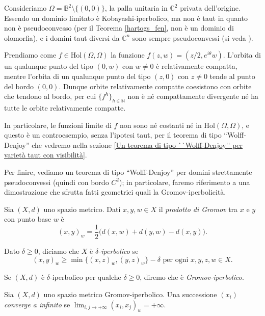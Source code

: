 \begin{ex} \label{servetaut}
    Consideriamo $\Omega=\mathbb{B}^2\setminus\{(0,0)\}$, la palla unitaria in $\mathbb{C}^2$ privata dell'origine. Essendo un dominio limitato è Kobayashi-iperbolico, ma non è taut in quanto non è pseudoconvesso (per il Teorema \ref{hartogs_fen}, non è un dominio di olomorfia), e i domini taut diversi da $\mathbb{C}^n$ sono sempre pseudoconvessi (si veda \cite[Theorem F]{Wu}).

    Prendiamo come $f\in\text{Hol}(\Omega,\Omega)$ la funzione $f(z,w)=(z/2,e^{i\theta}w)$. L'orbita di un qualunque punto del tipo $(0,w)$ con $w\not=0$ è relativamente compatta, mentre l'orbita di un qualunque punto del tipo $(z,0)$ con $z\not=0$ tende al punto del bordo $(0,0)$. Dunque orbite relativamente compatte coesistono con orbite che tendono al bordo, per cui $\{f^h\}_{h\in\mathbb{N}}$ non è né compattamente divergente né ha tutte le orbite relativamente compatte.
    
    In particolare, le funzioni limite di $f$ non sono né costanti né in $\text{Hol}(\Omega,\Omega)$, e questo è un controesempio, senza l'ipotesi taut, per il teorema di tipo ``Wolff-Denjoy'' che vedremo nella sezione \ref{Un teorema di tipo ``Wolff-Denjoy'' per varietà taut con visibilità}.
\end{ex}

Per finire, vediamo un teorema di tipo ``Wolff-Denjoy'' per domini strettamente pseudoconvessi (quindi con bordo $C^2$); in particolare, faremo riferimento a una dimostrazione che sfrutta fatti geometrici quali la Gromov-iperbolicità.

\begin{defn}
    Sia $(X,d)$ uno spazio metrico. Dati $x,y,w \in X$ il \textit{prodotto di Gromov} tra $x$ e $y$ con punto base $w$ è
    $$(x,y)_w=\frac{1}{2}\big(d(x,w)+d(y,w)-d(x,y)\big).$$
    
    Dato $\delta \ge 0$, diciamo che $X$ è \textit{$\delta$-iperbolico} se
    $$(x,y)_w \ge \min\{(x,z)_w,(y,z)_w\}-\delta\text{ per ogni }x,y,z,w \in X.$$

    Se $(X,d)$ è $\delta$-iperbolico per qualche $\delta \ge 0$, diremo che è \textit{Gromov-iperbolico}.
\end{defn}

\begin{defn}
    Sia $(X,d)$ uno spazio metrico Gromov-iperbolico. Una successione $(x_i)$ \textit{converge a infinito} se $\displaystyle\lim_{i,j\rightarrow+\infty}(x_i,x_j)_w=+\infty$.
\end{defn}

